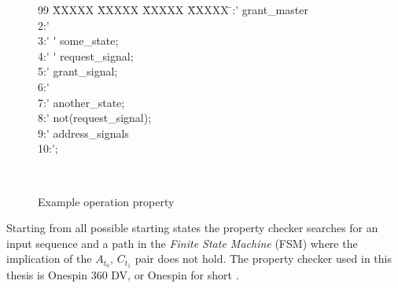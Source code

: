 \begin{figure}[h]
	\centering	
	\begin{minipage}[b]{0.9\linewidth}
	\sffamily\footnotesize
		\begin{tabbing}
			99 \= XXXXX \= XXXXX \= XXXXX \= XXXXX \= :\'  grant\_master  \\
			2:\' \\
			3:\'\> \ITLAS \'\>  some\_state; \\
			4:\'\> \ITLAS \'\>  request\_signal; \\
			5:\'\>  grant\_signal; \\
			6:\'  \\ 
			7:\'\>  another\_state; \\
			8:\'\>  not(request\_signal); \\
                        9:\'\>  address\_signals \\
			10:\' ; \\
		\end{tabbing}  
	\end{minipage}\\
	\sffamily\footnotesize
	\caption{Example operation property}
	\label{fig:exop}
\end{figure}

Starting from all possible starting states the property checker searches for an input sequence and a path in the \textit{Finite State Machine} (FSM) where the implication of the $A_{t_0}$, $C_{t_1}$ pair does not hold. The property checker used in this thesis is Onespin 360 DV, or Onespin for short \cite{onespin}. 

